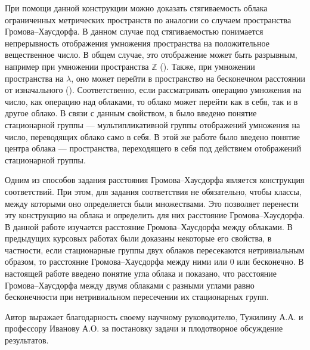 При помощи данной конструкции можно доказать стягиваемость облака ограниченных
метрических пространств по аналогии со случаем пространства Громова--Хаусдорфа.
В данном случае под стягиваемостью понимается непрерывность отображения
умножения пространства на положительное вещественное число.
В общем случае, это отображение может быть разрывным, например при умножении
пространства \( \mathbb{Z} \)
(\cite{mikhailov2025newgeodesiclinesgromovhausdorff}). Также, при умножении
пространства на \( \lambda \), оно может перейти в пространство на бесконечном
расстоянии от изначального (\cite{TuzhBog1}). Соответственно, если
рассматривать операцию умножения на число, как операцию над облаками, то облако
может перейти как в себя, так и в другое облако. В связи с данным свойством, в
\cite{TuzhBog2} было введено понятие стационарной группы --- мультипликативной
группы отображений умножения на число, переводящих облако само в себя. В этой
же работе было введено понятие центра облака --- пространства, переходящего в
себя под действием отображений стационарной группы.

Одним из способов задания расстояния Громова--Хаусдорфа является конструкция
соответствий. При этом, для задания соответствия не обязательно, чтобы классы,
между которыми оно определяется были множествами. Это позволяет перенести эту
конструкцию на облака и определить для них расстояние Громова--Хаусдорфа. В
данной работе изучается расстояние Громова--Хаусдорфа между облаками. В
предыдущих курсовых работах были доказаны некоторые его свойства, в частности,
если стационарные группы двух облаков пересекаются нетривиальным образом, то
расстояние Громова--Хаусдорфа между ними или \( 0 \) или бесконечно. В
настоящей работе введено понятие угла облака и показано, что расстояние
Громова--Хаусдорфа между двумя облаками с разными углами равно бесконечности
при нетривиальном пересечении их стационарных групп.

Автор выражает благодарность своему научному руководителю, Тужилину А.А. и
профессору Иванову А.О. за постановку задачи и плодотворное обсуждение
результатов.
